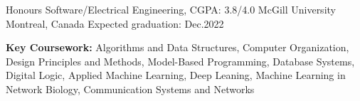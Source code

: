 
\begin{cventries}
  \cventry
    {Honours Software/Electrical Engineering, CGPA: 3.8/4.0} %
    {McGill University} %
    {Montreal, Canada} %
    {Expected graduation: Dec.2022} %
    {
      \begin{cvitems} %
         \item {\textbf{Key Coursework:} Algorithms and Data Structures, Computer Organization, Design Principles and Methods, Model-Based Programming, Database Systems, Digital Logic, Applied Machine Learning, Deep Leaning, Machine Learning in Network Biology, Communication Systems and Networks}
         \vspace{0.5mm}
      \end{cvitems}
    }
\end{cventries}
